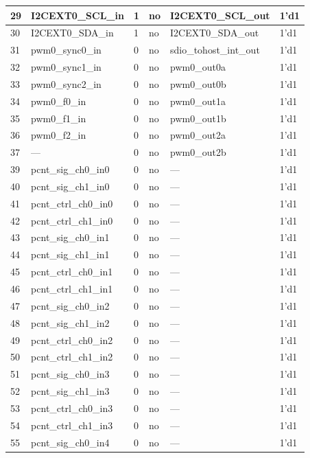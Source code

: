 \begin{longtable}[c]{|p{1cm}|p{3.3cm}|p{1.5cm}|p{2.4cm}|p{4.3cm}|p{2.5cm}| }
    29 & I2CEXT0\_SCL\_in & 1 & no & I2CEXT0\_SCL\_out & 1'd1 \\ \hline
    30 & I2CEXT0\_SDA\_in & 1 & no & I2CEXT0\_SDA\_out & 1'd1 \\ \hline
    31 & pwm0\_sync0\_in & 0 & no & sdio\_tohost\_int\_out & 1'd1 \\ \hline
    32 & pwm0\_sync1\_in & 0 & no & pwm0\_out0a & 1'd1 \\ \hline
    33 & pwm0\_sync2\_in & 0 & no & pwm0\_out0b & 1'd1 \\ \hline
    34 & pwm0\_f0\_in & 0 & no & pwm0\_out1a & 1'd1 \\ \hline
    35 & pwm0\_f1\_in & 0 & no & pwm0\_out1b & 1'd1 \\ \hline
    36 & pwm0\_f2\_in & 0 & no & pwm0\_out2a & 1'd1 \\ \hline
    37 & --- & 0 & no & pwm0\_out2b & 1'd1 \\ \hline
    39 & pcnt\_sig\_ch0\_in0 & 0 & no & --- & 1'd1 \\ \hline
    40 & pcnt\_sig\_ch1\_in0 & 0 & no & --- & 1'd1 \\ \hline
    41 & pcnt\_ctrl\_ch0\_in0 & 0 & no & --- & 1'd1 \\ \hline
    42 & pcnt\_ctrl\_ch1\_in0 & 0 & no & --- & 1'd1 \\ \hline
    43 & pcnt\_sig\_ch0\_in1 & 0 & no & --- & 1'd1 \\ \hline
    44 & pcnt\_sig\_ch1\_in1 & 0 & no &  --- & 1'd1 \\ \hline
    45 & pcnt\_ctrl\_ch0\_in1 & 0 & no & --- & 1'd1 \\ \hline
    46 & pcnt\_ctrl\_ch1\_in1 & 0 & no & --- & 1'd1 \\ \hline
    47 & pcnt\_sig\_ch0\_in2 & 0 & no & --- & 1'd1 \\ \hline
    48 & pcnt\_sig\_ch1\_in2 & 0 & no & --- & 1'd1 \\ \hline
    49 & pcnt\_ctrl\_ch0\_in2 & 0 & no & --- & 1'd1 \\ \hline
    50 & pcnt\_ctrl\_ch1\_in2 & 0 & no & --- & 1'd1 \\ \hline
    51 & pcnt\_sig\_ch0\_in3 & 0 & no &  --- & 1'd1 \\ \hline
    52 & pcnt\_sig\_ch1\_in3 & 0 & no & --- & 1'd1 \\ \hline
    53 & pcnt\_ctrl\_ch0\_in3 & 0 & no & --- & 1'd1 \\ \hline
    54 & pcnt\_ctrl\_ch1\_in3 & 0 & no & --- & 1'd1 \\ \hline
    55 & pcnt\_sig\_ch0\_in4 & 0 & no & --- & 1'd1 \\ \hline

\end{longtable}
